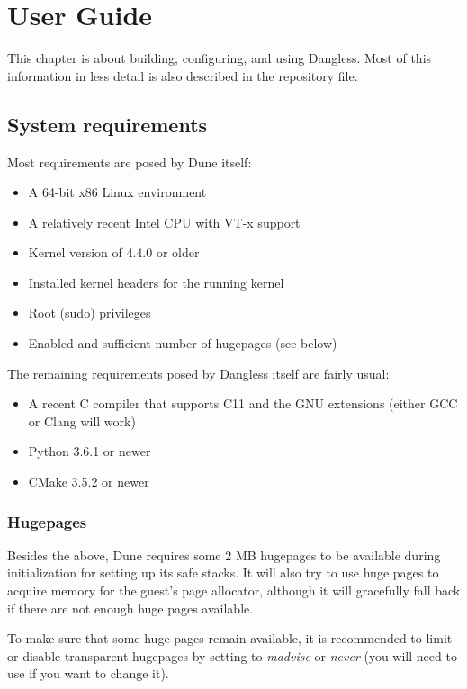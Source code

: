 \chapter{User Guide}
\label{ch:user-guide}

This chapter is about building, configuring, and using Dangless.
Most of this information in less detail is also described in the repository  file.

\section{System requirements}

Most requirements are posed by Dune itself:

\begin{itemize}
	\item A 64-bit x86 Linux environment
	\item A relatively recent Intel CPU with VT-x support
	\item Kernel version of 4.4.0 or older
	\item Installed kernel headers for the running kernel
	\item Root (sudo) privileges
	\item Enabled and sufficient number of hugepages (see below)
\end{itemize}

The remaining requirements posed by Dangless itself are fairly usual:

\begin{itemize}
	\item A recent C compiler that supports C11 and the GNU extensions (either GCC or Clang will work)
	\item Python 3.6.1 or newer
	\item CMake 3.5.2 or newer
\end{itemize}

\subsection{Hugepages}

Besides the above, Dune requires some 2 MB hugepages to be available during initialization for setting up its safe stacks. It will also try to use huge pages to acquire memory for the guest's page allocator, although it will gracefully fall back if there are not enough huge pages available.

To make sure that some huge pages remain available, it is recommended to limit or disable transparent hugepages by setting  to \emph{madvise} or \emph{never} (you will need to use  if you want to change it).

